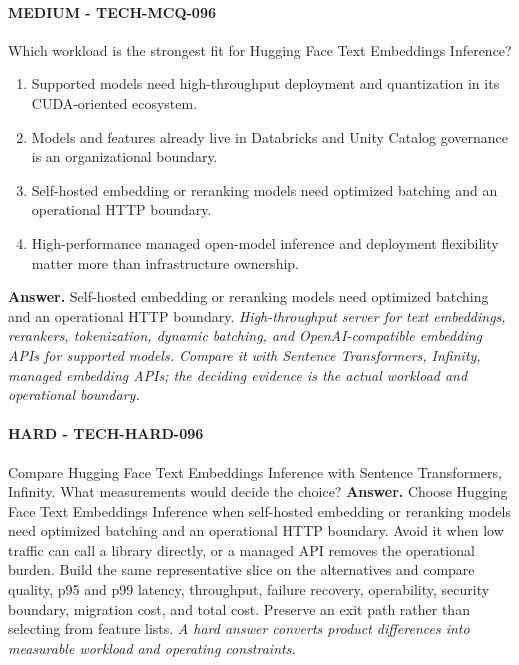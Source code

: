 \paragraph{MEDIUM - TECH-MCQ-096} Which workload is the strongest fit for Hugging Face Text Embeddings Inference?
\begin{enumerate}[label=\Alph*.]
\item Supported models need high-throughput deployment and quantization in its CUDA-oriented ecosystem.
\item Models and features already live in Databricks and Unity Catalog governance is an organizational boundary.
\item Self-hosted embedding or reranking models need optimized batching and an operational HTTP boundary.
\item High-performance managed open-model inference and deployment flexibility matter more than infrastructure ownership.
\end{enumerate}
\textbf{Answer.} Self-hosted embedding or reranking models need optimized batching and an operational HTTP boundary.
\textit{High-throughput server for text embeddings, rerankers, tokenization, dynamic batching, and OpenAI-compatible embedding APIs for supported models. Compare it with Sentence Transformers, Infinity, managed embedding APIs; the deciding evidence is the actual workload and operational boundary.}
\paragraph{HARD - TECH-HARD-096} Compare Hugging Face Text Embeddings Inference with Sentence Transformers, Infinity. What measurements would decide the choice?
\textbf{Answer.} Choose Hugging Face Text Embeddings Inference when self-hosted embedding or reranking models need optimized batching and an operational HTTP boundary. Avoid it when low traffic can call a library directly, or a managed API removes the operational burden. Build the same representative slice on the alternatives and compare quality, p95 and p99 latency, throughput, failure recovery, operability, security boundary, migration cost, and total cost. Preserve an exit path rather than selecting from feature lists.
\textit{A hard answer converts product differences into measurable workload and operating constraints.}
